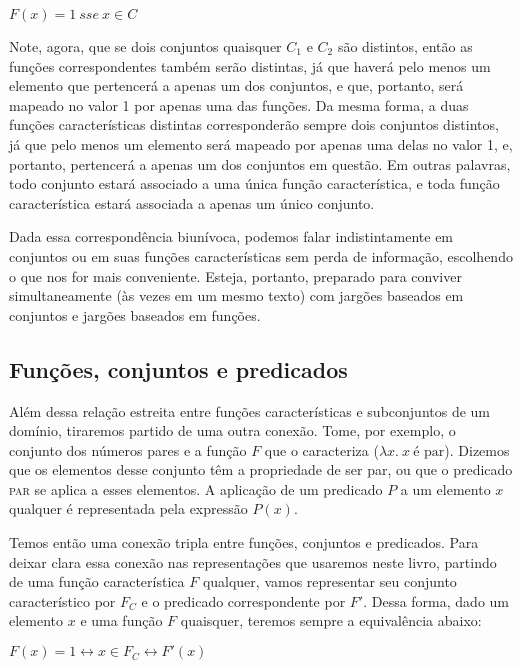 \begin{exe}
	\ex $F(x) = 1\ sse\ x \in C $
\end{exe}

\n Note, agora, que se dois conjuntos quaisquer $C_1$ e $C_2$ são distintos, então as funções correspondentes também serão distintas, já que haverá pelo menos um elemento que pertencerá a apenas um dos conjuntos, e que, portanto, será mapeado no valor 1 por apenas uma das funções. Da mesma forma, a duas funções características distintas corresponderão
sempre dois conjuntos distintos, já que pelo menos um elemento será mapeado por apenas uma delas no valor 1, e, portanto, pertencerá a apenas um dos conjuntos em questão. Em outras palavras, todo conjunto estará associado a uma única função característica, e toda função característica estará associada a apenas um único conjunto.

Dada essa correspondência biunívoca, podemos falar indistintamente em conjuntos ou em suas funções características sem perda de
informação, escolhendo o que nos for mais conveniente. Esteja,
portanto, preparado para conviver simultaneamente (às vezes em um
mesmo texto) com jargões baseados em conjuntos e jargões baseados em funções.

\subsection{Funções, conjuntos e predicados}

Além dessa relação estreita entre funções características e subconjuntos de um domínio, tiraremos partido de uma outra conexão. Tome, por exemplo, o conjunto dos números pares e a função $F$ que o caracteriza ($\lambda x.\ x\ \text{é par}$). Dizemos que os elementos desse conjunto têm a propriedade de ser par, ou que o predicado \textsc{par} se aplica a esses elementos. A aplicação de um predicado $P$ a um elemento $x$ qualquer é representada pela expressão $P(x)$.

Temos então uma conexão tripla entre funções, conjuntos e predicados. Para deixar clara essa conexão nas representações que usaremos neste livro, partindo de uma função característica $F$ qualquer, vamos representar seu conjunto característico por $F_C$ e o predicado correspondente por $F'$. Dessa forma, dado um elemento $x$ e uma função $F$ quaisquer, teremos sempre a equivalência abaixo:

\begin{exe}
	\ex $F(x)=1 \leftrightarrow x \in F_C \leftrightarrow F'(x)$
\end{exe}

